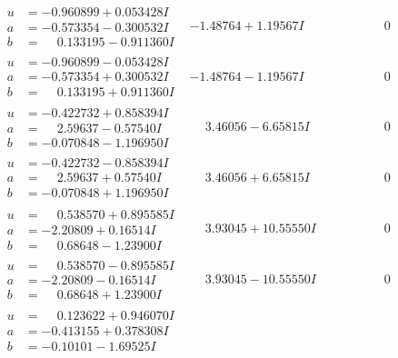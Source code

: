 \documentclass[1p]{elsarticle_modified}
\theoremstyle{definition}
\begin{document}
$$\begin{array}{c|c|c}
\begin{aligned}
u &= -0.960899 + 0.053428 I \\
a &= -0.573354 - 0.300532 I \\
b &= \phantom{-}0.133195 - 0.911360 I\end{aligned}
 & -1.48764 + 1.19567 I & \phantom{-0.000000 } 0 \\ \hline\begin{aligned}
u &= -0.960899 - 0.053428 I \\
a &= -0.573354 + 0.300532 I \\
b &= \phantom{-}0.133195 + 0.911360 I\end{aligned}
 & -1.48764 - 1.19567 I & \phantom{-0.000000 } 0 \\ \hline\begin{aligned}
u &= -0.422732 + 0.858394 I \\
a &= \phantom{-}2.59637 - 0.57540 I \\
b &= -0.070848 - 1.196950 I\end{aligned}
 & \phantom{-}3.46056 - 6.65815 I & \phantom{-0.000000 } 0 \\ \hline\begin{aligned}
u &= -0.422732 - 0.858394 I \\
a &= \phantom{-}2.59637 + 0.57540 I \\
b &= -0.070848 + 1.196950 I\end{aligned}
 & \phantom{-}3.46056 + 6.65815 I & \phantom{-0.000000 } 0 \\ \hline\begin{aligned}
u &= \phantom{-}0.538570 + 0.895585 I \\
a &= -2.20809 + 0.16514 I \\
b &= \phantom{-}0.68648 - 1.23900 I\end{aligned}
 & \phantom{-}3.93045 + 10.55550 I & \phantom{-0.000000 } 0 \\ \hline\begin{aligned}
u &= \phantom{-}0.538570 - 0.895585 I \\
a &= -2.20809 - 0.16514 I \\
b &= \phantom{-}0.68648 + 1.23900 I\end{aligned}
 & \phantom{-}3.93045 - 10.55550 I & \phantom{-0.000000 } 0 \\ \hline\begin{aligned}
u &= \phantom{-}0.123622 + 0.946070 I \\
a &= -0.413155 + 0.378308 I \\
b &= -0.10101 - 1.69525 I\end{aligned}

\end{array}$$
\end{document}
